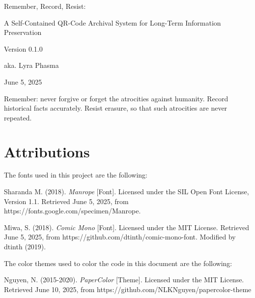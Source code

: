 

\renewcommand{\setflag}{\newif \ifwhole
\wholetrue}

\begin{titlepage}
  \centering
  \vspace*{\fill}

  {\fontsize{2.625em}{3em}\selectfont\ManropeExtraBold Remember, Record, Resist: \par}
  {\HUGE A Self-Contained QR-Code Archival System for Long-Term Information Preservation \par}
  {\Large Version 0.1.0 \par}
  {\Large aka. Lyra Phasma \par}
  {\Large June 5, 2025 \par}

  \vspace*{\fill}
\end{titlepage}

Remember: never forgive or forget the atrocities against humanity. Record historical facts accurately. Resist erasure, so that such atrocities are never repeated.

\appendix



\chapter{Attributions}

The fonts used in this project are the following:

Sharanda M. (2018). \textit{Manrope} [Font]. Licensed under the SIL Open Font License, Version 1.1. Retrieved June 5, 2025, from https://fonts.google.com/specimen/Manrope.

Miwa, S. (2018). \textit{Comic Mono} [Font]. Licensed under the MIT License. Retrieved June 5, 2025, from https://github.com/dtinth/comic-mono-font. Modified by dtinth (2019).

The color themes used to color the code in this document are the following:

Nguyen, N. (2015-2020). \textit{PaperColor} [Theme]. Licensed under the MIT License. Retrieved June 10, 2025, from https://github.com/NLKNguyen/papercolor-theme

\printbibliography[heading=bibnumbered]


